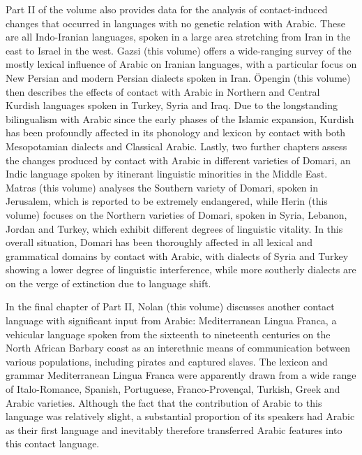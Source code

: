 \documentclass[output=paper]{langsci/langscibook}
\begin{document}
Part II of the volume also provides data for the analysis of contact-induced changes that occurred in languages with no genetic relation with Arabic. These are all Indo-Iranian languages, spoken in a large area stretching from Iran in the east to Israel in the west. Gazsi (this volume) offers a wide-ranging survey of the mostly lexical influence of Arabic on Iranian languages, with a particular focus on New Persian and modern Persian dialects spoken in Iran. Öpengin (this volume) then describes the effects of contact with Arabic in Northern and Central Kurdish languages spoken in Turkey, Syria and Iraq. Due to the longstanding bilingualism with Arabic since the early phases of the Islamic expansion, Kurdish has been profoundly affected in its phonology and lexicon by contact with both Mesopotamian dialects and Classical Arabic. Lastly, two further chapters assess the changes produced by contact with Arabic in different varieties of Domari, an Indic language spoken by itinerant linguistic minorities in the Middle East. Matras (this volume) analyses the Southern variety of Domari, spoken in Jerusalem, which is reported to be extremely endangered, while Herin (this volume) focuses on the Northern varieties of Domari, spoken in Syria, Lebanon, Jordan and Turkey, which exhibit different degrees of linguistic vitality. In this overall situation, Domari has been thoroughly affected in all lexical and grammatical domains by contact with Arabic, with dialects of Syria and Turkey showing a lower degree of linguistic interference, while more southerly dialects are on the verge of extinction due to language shift.  

In the final chapter of Part II, Nolan (this volume) discusses another contact language with significant input from Arabic: Mediterranean Lingua Franca, a vehicular language spoken from the sixteenth to nineteenth centuries on the North African Barbary coast as an interethnic means of communication between various populations, including pirates and captured slaves. The lexicon and grammar Mediterranean Lingua Franca were apparently drawn from a wide range of Italo-Romance, Spanish, Portuguese, Franco-Provençal, Turkish, Greek and Arabic varieties. Although the fact that the contribution of Arabic to this language was relatively slight, a substantial proportion of its speakers had Arabic as their first language and inevitably therefore transferred Arabic features into this contact language.
\end{document}
